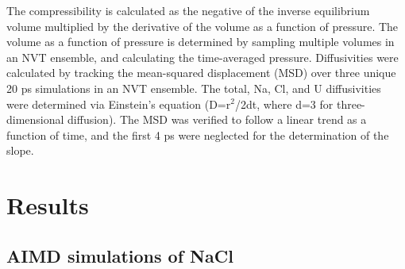 \documentclass[preprint,3p,10pt,onecolumn,number,sort&compress]{elsarticle}
\begin{document}
The compressibility is calculated as the negative of the inverse equilibrium volume multiplied by the derivative of the volume as a function of pressure. The volume as a function of pressure is determined by sampling multiple volumes in an NVT ensemble, and calculating the time-averaged pressure. Diffusivities were calculated by tracking the mean-squared displacement (MSD) over three unique 20 ps simulations in an NVT ensemble. The total, Na, Cl, and U diffusivities were determined via Einstein's equation (D=r$^2$/2dt, where d=3 for three-dimensional diffusion). The MSD was verified to follow a linear trend as a function of time, and the first 4 ps were neglected for the determination of the slope.




\section{Results}
\label{sec:results}
\subsection{AIMD simulations of NaCl}
\end{document}

